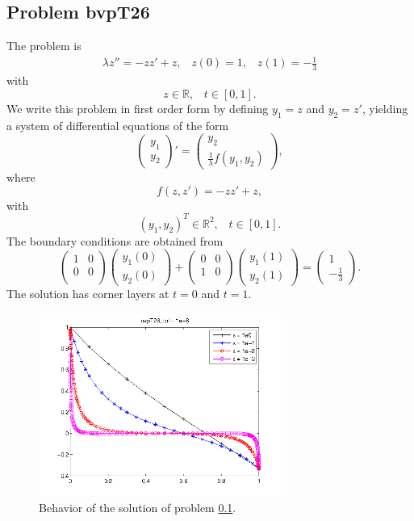 \documentclass[<options>]{article}
\def \RR {{\mathbb{R}}}
\begin{document}
\subsection{Problem bvpT26}\label{test26}
The problem is 
\begin{eqnarray*}
\lambda z'' = - z z' +  z , \;\;\;z(0) =1, \;\;\; z(1) = -\frac{1}{3}
\end{eqnarray*}
with
\[
z \in \RR, \;\;\; t\in [0,1].
\]
We write this problem in first order form by defining $y_1=z$ and $y_2=z'$, yielding a system of differential equations of the form
\begin{equation*}
\left(\begin{array}{c}
y_1\\
y_2
\end{array}\right)'=
\left(\begin{array}{c}
y_2\\
\frac{1}{\lambda}f(y_1,y_2)
\end{array}\right),
\end{equation*}
where
\begin{equation*}
f(z,z') = - z z' +  z,
\end{equation*}
with
\[
(y_1,y_2)^T \in \RR^{2}, \;\;\;  t \in [0,1].
\]
The  boundary conditions are obtained from
\begin{equation*}
\left(
  \begin{array}{cc}
    1 & 0 \\
    0 & 0 \\
  \end{array}
\right)
\left(\begin{array}{c}
y_{1}(0)\\
y_{2}(0)
\end{array}\right)
+
\left(
  \begin{array}{cc}
    0 & 0 \\
    1 & 0 \\
  \end{array}
\right)
\left(\begin{array}{c}
y_{1}(1)\\
y_{2}(1)
\end{array}\right)=\left(\begin{array}{c}
1 \\
-\frac{1}{3}
\end{array}\right).
\end{equation*}
The solution has corner layers at $t= 0$ and $t= 1.$

\begin{figure}[htb]
\centerline{\includegraphics[height=6cm]{Prob26}}
\caption{Behavior of the solution of problem \ref{test26}.}
\end{figure}
\newpage
\end{document}
